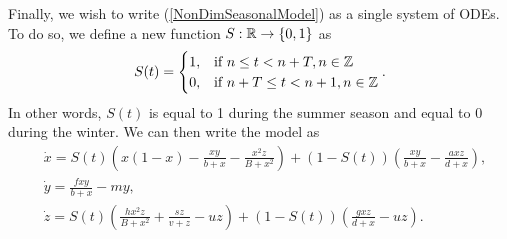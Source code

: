 \documentclass[12pt]{UOthesis}
\theoremstyle{remarkstyle}
\begin{document}
Finally, we wish to write (\ref{NonDimSeasonalModel}) as a single system of ODEs. To do so, we define a new function $S:\mathbb R\rightarrow \{0,1\}$ as
\begin{equation*}
	S(t)=\begin{cases}
		1, & \text{if } n\le t< n+T, n\in \mathbb Z\\
		0, & \text{if } n+T\le t<n+1, n\in \mathbb Z
	\end{cases}.
\end{equation*}
In other words, $S(t)$ is equal to 1 during the summer season and equal to 0 during the winter. We can then write the model as
\begin{equation}
	\begin{split}
		&\dot{x}=S(t)\left(x(1-x)-\frac{xy}{b+x}-\frac{x^2 z}{B+x^2}\right)+(1-S(t))\left(\frac{xy}{b+x}-\frac{axz}{d+x}\right),\\
		&\dot{y}=\frac{fxy}{b+x}-my,\\
		&\dot{z}=S(t)\left(\frac{hx^2z}{B+x^2}+\frac{sz}{v+z}-uz\right)+(1-S(t))\left(\frac{gxz}{d+x}-uz\right).
	\end{split}
	\label{NonDimSeasonalODE}
\end{equation}
\end{document}
